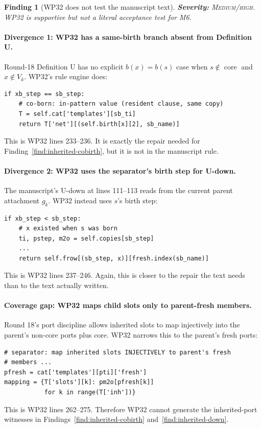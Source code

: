 \documentclass[11pt]{article}
\newcommand{\core}{\operatorname{core}}
\newcommand{\sev}[1]{\textsc{#1}}
\newtheorem{finding}{Finding}
\theoremstyle{remark}
\begin{document}
\begin{finding}[WP32 does not test the manuscript text]
\label{find:wp32}
\textbf{Severity:} \sev{Medium/high}.  WP32 is supportive but not a literal acceptance test for M6.
\end{finding}

\paragraph{Divergence 1: WP32 has a same-birth branch absent from Definition U.}
Round-18 Definition U has no explicit $b(x)=b(s)$ case when $s\notin\core$ and $x\notin V_k$.  WP32's rule engine does:
\begin{lstlisting}[style=reviewpython]
if xb_step == sb_step:
    # co-born: in-pattern value (resident clause, same copy)
    T = self.cat['templates'][sb_ti]
    return T['net'][(self.birth[x][2], sb_name)]
\end{lstlisting}
This is WP32 lines 233--236.  It is exactly the repair needed for Finding~\ref{find:inherited-cobirth}, but it is not in the manuscript rule.

\paragraph{Divergence 2: WP32 uses the separator's birth step for U-down.}
The manuscript's U-down at lines 111--113 reads from the current parent attachment $g_k$.  WP32 instead uses $s$'s birth step:
\begin{lstlisting}[style=reviewpython]
if xb_step < sb_step:
    # x existed when s was born
    ti, pstep, m2o = self.copies[sb_step]
    ...
    return self.frow[(sb_step, x)][fresh.index(sb_name)]
\end{lstlisting}
This is WP32 lines 237--246.  Again, this is closer to the repair the text needs than to the text actually written.

\paragraph{Coverage gap: WP32 maps child slots only to parent-fresh members.}
Round 18's port discipline allows inherited slots to map injectively into the parent's non-core ports plus core.  WP32 narrows this to the parent's fresh ports:
\begin{lstlisting}[style=reviewpython]
# separator: map inherited slots INJECTIVELY to parent's fresh
# members ...
pfresh = cat['templates'][pti]['fresh']
mapping = {T['slots'][k]: pm2o[pfresh[k]]
           for k in range(T['inh'])}
\end{lstlisting}
This is WP32 lines 262--275.  Therefore WP32 cannot generate the inherited-port witnesses in Findings~\ref{find:inherited-cobirth} and~\ref{find:inherited-down}.
\end{document}
